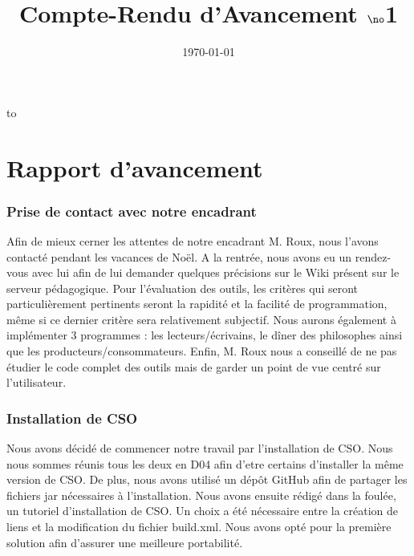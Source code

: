 \documentclass[a4paper,11pt]{article}
\date{\today}
\title{Compte-Rendu d'Avancement $\no$1}
\makeatletter
\def\clap#1{\hbox to 0pt{\hss #1\hss}} %
\def\ligne#1{\hbox to \hsize{\vbox{\centering #1}}} %
\def\haut#1#2#3{\hbox to \hsize{\rlap{\vtop{\raggedright #1}}\hss \clap{\vtop{\centering #2}} \hss \llap{\vtop{\raggedleft #3}}}}%
\def\bas#1#2#3{\hbox to \hsize{\rlap{\vbox{\raggedright #1}} \hss \clap{\vbox{\centering #2}} \hss \llap{\vbox{\raggedleft #3}}}}%
\def\maketitle{%
	  \thispagestyle{empty}\vbox to \vsize{%
		\vspace{5mm} \ligne{\Huge \@title}
		\vspace{1cm} \haut{Supervisé par \@supervisor}{}{\@follower}
		\vspace{3mm}\hrule
		\vfill
		\bas{}{\@location, \@date}{}
		}%
	  }
\makeatother
\begin{document}
\maketitle

\part*{Rapport d'avancement}

\section{Prise de contact avec notre encadrant}

Afin de mieux cerner les attentes de notre encadrant M. Roux, nous l'avons contacté pendant les vacances de Noël. A la rentrée, nous avons eu un rendez-vous avec lui afin de lui demander quelques précisions sur le Wiki présent sur le serveur pédagogique. Pour l'évaluation des outils, les critères qui seront particulièrement pertinents seront la rapidité et la facilité de programmation, même si ce dernier critère sera relativement subjectif.
Nous aurons également à implémenter 3 programmes : les lecteurs/écrivains, le dîner des philosophes ainsi que les producteurs/consommateurs.
Enfin, M. Roux nous a conseillé de ne pas étudier le code complet des outils mais de garder un point de vue centré sur l'utilisateur.

\section{Installation de CSO}

Nous avons décidé de commencer notre travail par l'installation de CSO. Nous nous sommes réunis tous les deux en D04 afin d'etre certains d'installer la même version de CSO. De plus, nous avons utilisé un dépôt GitHub afin de partager les fichiers jar nécessaires à l'installation.
Nous avons ensuite rédigé dans la foulée, un tutoriel d'installation de CSO. Un choix a été nécessaire entre la création de liens et la modification du fichier build.xml. Nous avons opté pour la première solution afin d'assurer une meilleure portabilité.
\end{document}
